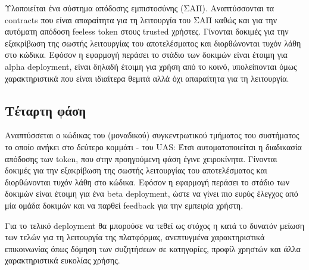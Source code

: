 Υλοποιείται ένα σύστημα απόδοσης εμπιστοσύνης (ΣΑΠ).
Αναπτύσσονται τα contracts που είναι απαραίτητα για τη λειτουργία του ΣΑΠ καθώς και για την αυτόματη απόδοση feeless token στους trusted χρήστες.
Γίνονται δοκιμές για την εξακρίβωση της σωστής λειτουργίας του αποτελέσματος και διορθώνονται τυχόν λάθη στο κώδικα.
Εφόσον η εφαρμογή περάσει το στάδιο των δοκιμών είναι έτοιμη για alpha deployment, είναι δηλαδή έτοιμη για χρήση από το κοινό, υπολείπονται όμως χαρακτηριστικά που είναι ιδιαίτερα θεμιτά αλλά όχι απαραίτητα για τη λειτουργία.

\subsection{Τέταρτη φάση}

Αναπτύσσεται ο κώδικας του (μοναδικού) συγκεντρωτικού τμήματος του συστήματος το οποίο ανήκει στο δεύτερο κομμάτι - του UAS: Έτσι αυτοματοποιείται η διαδικασία απόδοσης των token, που στην προηγούμενη φάση έγινε χειροκίνητα.
Γίνονται δοκιμές για την εξακρίβωση της σωστής λειτουργίας του αποτελέσματος και διορθώνονται τυχόν λάθη στο κώδικα.
Εφόσον η εφαρμογή περάσει το στάδιο των δοκιμών είναι έτοιμη για ένα beta deployment, ώστε να γίνει πιο ευρύς έλεγχος από μία ομάδα δοκιμών και να παρθεί feedback για την εμπειρία χρήστη.

Για το τελικό deployment θα μπορούσε να τεθεί ως στόχος η κατά το δυνατόν μείωση των τελών για τη λειτουργία της πλατφόρμας, ανεπτυγμένα χαρακτηριστικά επικοινωνίας όπως δόμηση των συζητήσεων σε κατηγορίες, προφίλ χρηστών και άλλα χαρακτηριστικά ευκολίας χρήσης.
